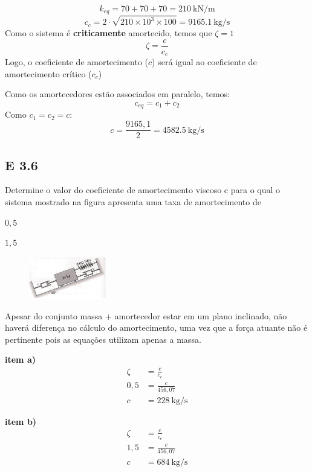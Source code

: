 \resol

\[
k_{eq}=70+70+70 = \SI{210}{\kilo\newton\per\meter}
\]
\[
c_{c}=2\cdot\sqrt{210\times 10^3 \times 100} = \SI{9165,1}{\kilogram\per\second}
\]
Como o sistema é \textbf{criticamente} amortecido, temos que $\zeta = 1$
\[ \zeta = \frac{c}{c_c} \]
Logo, o coeficiente de amortecimento ($c$) será igual ao coeficiente de amortecimento
crítico ($c_c$)

Como os amortecedores estão associados em paralelo, temos:
\[
c_{eq} = c_1+c_2
\]
Como $c_1=c_2=c$:
\[
c=\frac{9165,1}{2} = \SI{4582,5}{\kilogram\per\second}
\]

\subsection{E 3.6}
Determine o valor do coeficiente de amortecimento viscoso c para o qual o
sistema mostrado na figura apresenta uma taxa de amortecimento de
\begin{enumalpha}
    \item $0,5$
    \item $1,5$
\end{enumalpha}
\begin{figure}[ht]
    \centering
    \includegraphics[width=0.3\textwidth]{imagens/questao_3.6.png}
\end{figure}

\resol

Apesar do conjunto massa + amortecedor estar em um plano inclinado, não haverá
diferença no cálculo do amortecimento, uma vez que a força atuante não é pertinente pois
as equações utilizam apenas a massa.

\begin{minipage}{0.4\linewidth}
\textbf{item a)}
\begin{align*}
    \zeta &= \frac{c}{c_c}\\
    0,5& =\frac{c}{456,07}\\
    c &= \SI{228}{\kilogram\per\second}
\end{align*}
\end{minipage}
\begin{minipage}{0.4\linewidth}
\textbf{item b)}
\begin{align*}
    \zeta &= \frac{c}{c_c}\\
    1,5&=\frac{c}{456,07}\\
    c &= \SI{684}{\kilogram\per\second}
\end{align*}
\end{minipage}
